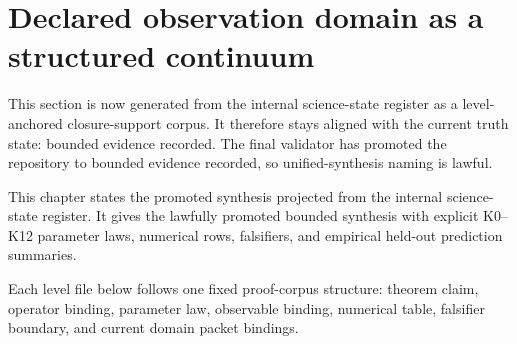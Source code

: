 \section{Declared observation domain as a structured continuum}
\label{sec:observed-universe-continuum}

This section is now generated from the internal science-state register as a level-anchored closure-support corpus.
It therefore stays aligned with the current truth state: bounded evidence recorded. The final validator has promoted the repository to bounded evidence recorded, so unified-synthesis naming is lawful.

This chapter states the promoted synthesis projected from the internal science-state register. It gives the lawfully promoted bounded synthesis with explicit K0--K12 parameter laws, numerical rows, falsifiers, and empirical held-out prediction summaries.

Each level file below follows one fixed proof-corpus structure: theorem claim, operator binding, parameter law, observable binding, numerical table, falsifier boundary, and current domain packet bindings.














